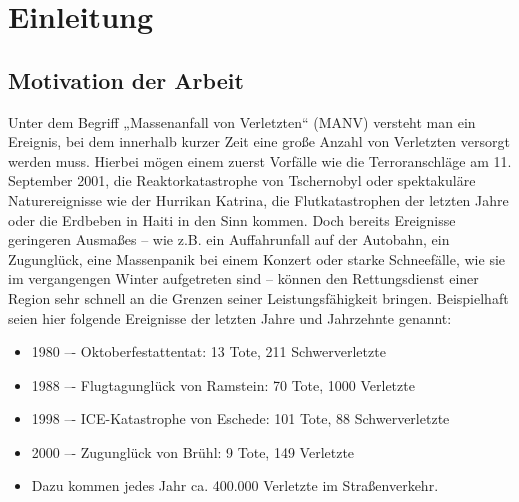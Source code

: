 \chapter{Einleitung}
\section{Motivation der Arbeit}
Unter dem Begriff „Massenanfall von Verletzten“ (MANV) versteht man ein Ereignis, bei dem innerhalb
kurzer Zeit eine große Anzahl von Verletzten versorgt werden muss. Hierbei mögen einem zuerst
Vorfälle wie die Terroranschläge am 11. September 2001, die Reaktorkatastrophe von Tschernobyl oder
spektakuläre Naturereignisse wie der Hurrikan Katrina, die Flutkatastrophen der letzten Jahre oder die
Erdbeben in Haiti in den Sinn kommen.
Doch bereits Ereignisse geringeren Ausmaßes -- wie z.B. ein Auffahrunfall auf der Autobahn, ein
Zugunglück, eine Massenpanik bei einem Konzert oder starke Schneefälle, wie sie im vergangengen
Winter aufgetreten sind -- können den Rettungsdienst einer Region sehr schnell an die Grenzen seiner
Leistungsfähigkeit bringen.
Beispielhaft seien hier folgende Ereignisse der letzten Jahre und Jahrzehnte genannt:

\begin{itemize}
    \item 1980 –- Oktoberfestattentat: 13 Tote, 211 Schwerverletzte
    \item 1988 –- Flugtagunglück von Ramstein: 70 Tote, 1000 Verletzte
    \item 1998 –- ICE-Katastrophe von Eschede: 101 Tote, 88 Schwerverletzte
    \item 2000 –- Zugunglück von Brühl: 9 Tote, 149 Verletzte
    \item Dazu kommen jedes Jahr ca. 400.000 Verletzte im Straßenverkehr.
\end{itemize}

